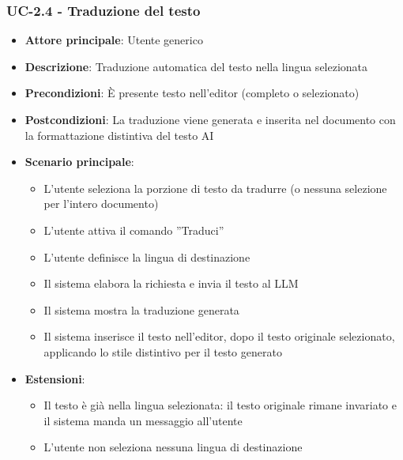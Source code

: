 \documentclass[11pt,a4paper]{article}
\begin{document}
\subsubsection{UC-2.4 - Traduzione del testo}
\begin{itemize}
    \item \textbf{Attore principale}: Utente generico
    \item \textbf{Descrizione}: Traduzione automatica del testo nella lingua selezionata
    \item \textbf{Precondizioni}: È presente testo nell’editor (completo o selezionato)
    \item \textbf{Postcondizioni}: La traduzione viene generata e inserita nel documento con la formattazione distintiva del testo AI
    \item \textbf{Scenario principale}:
    \begin{itemize}
        \item L’utente seleziona la porzione di testo da tradurre (o nessuna selezione per l'intero documento)
        \item L’utente attiva il comando ”Traduci”
        \item L’utente definisce la lingua di destinazione
        \item Il sistema elabora la richiesta e invia il testo al LLM
        \item Il sistema mostra la traduzione generata
        \item Il sistema inserisce il testo nell'editor, dopo il testo originale selezionato, applicando lo stile distintivo per il testo generato
    \end{itemize}
    \item \textbf{Estensioni}:
    \begin{itemize}
        \item Il testo è già nella lingua selezionata: il testo originale rimane invariato e il sistema manda un messaggio all’utente
        \item L’utente non seleziona nessuna lingua di destinazione
    \end{itemize}
\end{itemize}
\end{document}
